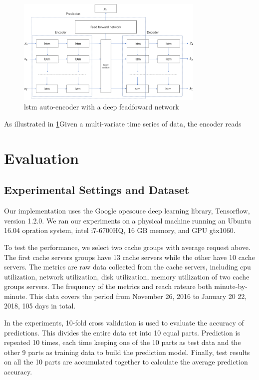 \documentclass[5p]{elsarticle}
\newcommand{\dabiaolv}{reach rate}
\begin{document}
\begin{figure}[h]
    \centering
    \includegraphics[width=0.8\textwidth]{our_models.png}
    \caption{lstm auto-encoder with a deep feadfoward network}
    \label{fig:our_models}
\end{figure}

As illustrated in \ref{fig:our_models}Given a multi-variate time series of data, the encoder reads 

\section{Evaluation}
\subsection{Experimental Settings and Dataset}
Our implementation uses the Google opesouce deep learning library, Tensorflow, version 1.2.0. We ran our experiments on a physical machine running an Ubuntu 16.04 opration system, intel i7-6700HQ, 16 GB memory, and GPU gtx1060.

To test the performance, we select two cache groups with average request above. The first cache servers groups have 13 cache servers while the other have 10 cache servers. The  metrics are raw data collected from the cache servers, including cpu utilization, network utilization, disk utilization, memory utilization of two cache groups servers. The frequency of the metrics and  \dabiaolv are both minute-by-minute. This data covers the period from November 26, 2016 to January 20 22, 2018, 105 days in total.

In the experiments, 10-fold cross validation is used to evaluate the accuracy of predictions. This divides the entire data set into 10 equal parts.  Prediction is repeated 10 times, each time keeping one of the 10 parts as test data and the other 9 parts as training data to build the prediction model. Finally, test results on all the 10 parts are accumulated together to calculate the average prediction accuracy.
\end{document}
